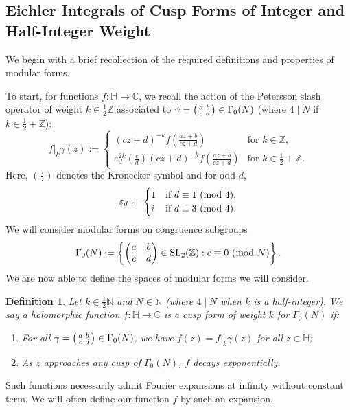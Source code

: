 \documentclass[12pt]{amsart}
\theoremstyle{definition}
\theoremstyle{plain}
\newtheorem{definition}[theorem]{Definition}
\renewcommand{\pmod}[1]{\,\,({\rm mod}\,\,{#1})}
\numberwithin{equation}{section}
\begin{document}
\subsection{Eichler Integrals of Cusp Forms of Integer and Half-Integer Weight} \label{subsec: modular}

We begin with a brief recollection of the required definitions and properties of modular forms. 

To start, for functions $f \colon \mathbb{H} \to \mathbb{C}$, we recall the action of the Petersson slash operator of weight $k \in \frac{1}{2}\mathbb{Z}$ associated to $\gamma = \begin{psmallmatrix} a & b \\ c& d \end{psmallmatrix} \in \Gamma_0(N)$ (where $4 \mid N$ if $k \in \frac{1}{2} + \mathbb{Z}$):
\begin{equation}\label{eqn: slash}
f|_k\gamma(z):= \begin{cases} (cz+d)^{-k}f\left(\frac{az+b}{cz+d}\right) & \text{for } k \in \mathbb{Z},\\
 \varepsilon_d^{2k}\left(\frac{c}{d}\right) (cz+d)^{-k} 	f\left(\frac{az+b}{cz+d}\right) & \text{for } k \in \frac{1}{2}+ \mathbb{Z}.
 \end{cases}
\end{equation}
Here, $\left(\frac{\cdot}{\cdot}\right)$ denotes the Kronecker symbol and for odd $d$,
\[\varepsilon_d:= \begin{cases}
 1 & \text{if } d \equiv 1 \pmod{4},\\
 i & \text{if } d \equiv 3 \pmod{4}.
 \end{cases}
\]
We will consider modular forms on congruence subgroups
\[\Gamma_0(N) :=\left\{ \begin{pmatrix} a & b \\ c& d \end{pmatrix} \in \text{SL}_2(\mathbb{Z}) : c \equiv 0 \pmod{N}\right\}.
\]
We are now able to define the spaces of modular forms we will consider.

\begin{definition}
	Let $k \in \frac{1}{2}\mathbb{N}$ and $N \in \mathbb{N}$ (where $4 \mid N$ when $k$ is a half-integer). We say a holomorphic function $f\colon \mathbb{H} \to \mathbb{C}$ is a cusp form of weight $k$ for $\Gamma_0(N)$ if:
	\begin{enumerate}
	\item For all $\gamma = \begin{psmallmatrix} a & b \\ c& d \end{psmallmatrix} \in \Gamma_0(N)$, we have $f(z) = f|_{k}\gamma(z)$ for all $z \in \mathbb{H}$;
	\item As $z$ approaches any cusp of $\Gamma_0(N)$, $f$ decays exponentially.	
	\end{enumerate}
\end{definition}
Such functions necessarily admit Fourier expansions at infinity without constant term. We will often define our function $f$ by such an expansion. 
\end{document}
